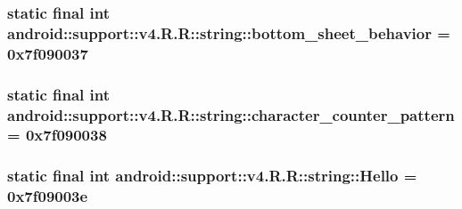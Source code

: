 \hypertarget{classandroid_1_1support_1_1v4_1_1_r_1_1string_9cd79d2e3ddc21874fc09bbccb3a6021}{
\subsubsection[{bottom\_\-sheet\_\-behavior}]{\setlength{\rightskip}{0pt plus 5cm}static final int android::support::v4.R.R::string::bottom\_\-sheet\_\-behavior = 0x7f090037}}
\label{classandroid_1_1support_1_1v4_1_1_r_1_1string_9cd79d2e3ddc21874fc09bbccb3a6021}


\hypertarget{classandroid_1_1support_1_1v4_1_1_r_1_1string_0e8e3f8521f0255a57493cbe6e738514}{
\subsubsection[{character\_\-counter\_\-pattern}]{\setlength{\rightskip}{0pt plus 5cm}static final int android::support::v4.R.R::string::character\_\-counter\_\-pattern = 0x7f090038}}
\label{classandroid_1_1support_1_1v4_1_1_r_1_1string_0e8e3f8521f0255a57493cbe6e738514}


\hypertarget{classandroid_1_1support_1_1v4_1_1_r_1_1string_f90433d2e5bbdab04f833ab2933904cf}{
\subsubsection[{Hello}]{\setlength{\rightskip}{0pt plus 5cm}static final int android::support::v4.R.R::string::Hello = 0x7f09003e}}
\label{classandroid_1_1support_1_1v4_1_1_r_1_1string_f90433d2e5bbdab04f833ab2933904cf}


